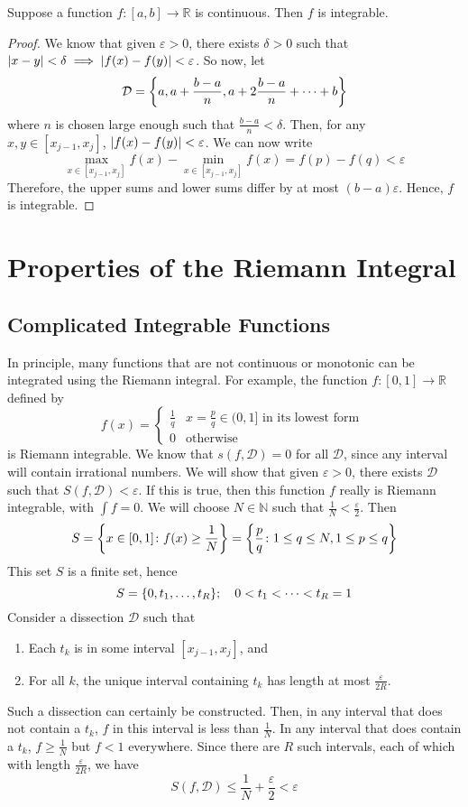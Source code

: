 \documentclass{article}
\begin{document}
\begin{theorem}
	Suppose a function $f \colon [a, b] \to \mathbb R$ is continuous. Then $f$ is integrable.
\end{theorem}
\begin{proof}
	We know that given $\varepsilon > 0$, there exists $\delta > 0$ such that $\abs{x - y} < \delta \implies \abs{f(x) - f(y)} < \varepsilon$. So now, let
	\[ \mathcal D = \qty{ a, a + \frac{b-a}{n}, a + 2\frac{b-a}{n} + \dots + b } \]
	where $n$ is chosen large enough such that $\frac{b-a}{n} < \delta$. Then, for any $x, y \in [x_{j-1}, x_j]$, $\abs{f(x) - f(y)} < \varepsilon$. We can now write
	\[ \max_{x \in [x_{j-1}, x_j]} f(x) - \min_{x \in [x_{j-1}, x_j]} f(x) = f(p) - f(q) < \varepsilon \]
	Therefore, the upper sums and lower sums differ by at most $(b-a)\varepsilon$. Hence, $f$ is integrable.
\end{proof}

\section{Properties of the Riemann Integral}
\subsection{Complicated Integrable Functions}
In principle, many functions that are not continuous or monotonic can be integrated using the Riemann integral. For example, the function $f\colon [0, 1] \to \mathbb R$ defined by
\[ f(x) = \begin{cases}
		\frac{1}{q} & x = \frac{p}{q} \in (0, 1] \text{ in its lowest form } \\
		0           & \text{otherwise}
	\end{cases} \]
is Riemann integrable. We know that $s(f, \mathcal D) = 0$ for all $\mathcal D$, since any interval will contain irrational numbers. We will show that given $\varepsilon > 0$, there exists $\mathcal D$ such that $S(f, \mathcal D) < \varepsilon$. If this is true, then this function $f$ really is Riemann integrable, with $\int f = 0$. We will choose $N \in \mathbb N$ such that $\frac{1}{N} < \frac{\varepsilon}{2}$. Then
\[ S = \qty{ x \in [0, 1] \colon f(x) \geq \frac{1}{N} } = \qty{ \frac{p}{q} \colon 1 \leq q \leq N, 1 \leq p \leq q } \]
This set $S$ is a finite set, hence
\[ S = \qty{ 0, t_1, \dots, t_R };\quad 0 < t_1 < \dots < t_R = 1 \]
Consider a dissection $\mathcal D$ such that
\begin{enumerate}[(1)]
	\item Each $t_k$ is in some interval $[x_{j-1}, x_j]$, and
	\item For all $k$, the unique interval containing $t_k$ has length at most $\frac{\varepsilon}{2R}$.
\end{enumerate}
Such a dissection can certainly be constructed. Then, in any interval that does not contain a $t_k$, $f$ in this interval is less than $\frac{1}{N}$. In any interval that does contain a $t_k$, $f \geq \frac{1}{N}$ but $f < 1$ everywhere. Since there are $R$ such intervals, each of which with length $\frac{\varepsilon}{2R}$, we have
\[ S(f, \mathcal D) \leq \frac{1}{N} + \frac{\varepsilon}{2} < \varepsilon \]
\end{document}

